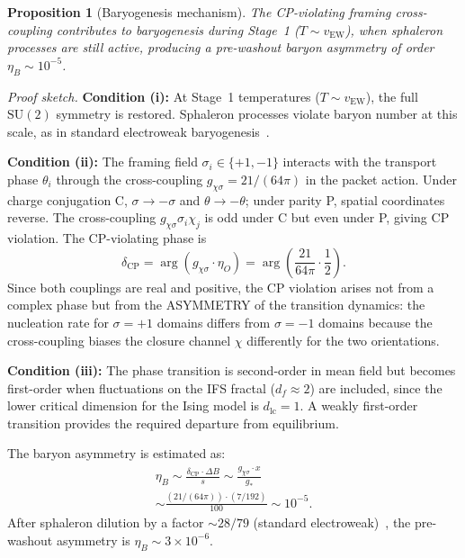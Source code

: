 \documentclass[11pt,twocolumn]{article}
\newtheorem{proposition}{Proposition}
\begin{document}
\begin{proposition}[Baryogenesis mechanism]
\label{thm:baryo}
The CP-violating framing cross-coupling contributes to baryogenesis during Stage~1 ($T\sim v_{\mathrm{EW}}$), when sphaleron processes are still active, producing a pre-washout baryon asymmetry of order $\eta_B\sim 10^{-5}$.
\end{proposition}

\textit{Proof sketch.}
\textbf{Condition (i):} At Stage~1 temperatures ($T\sim v_{\mathrm{EW}}$), the full $\mathrm{SU}(2)$ symmetry is restored.
Sphaleron processes violate baryon number at this scale, as in standard electroweak baryogenesis~\cite{kuzmin1985}.

\textbf{Condition (ii):} The framing field $\sigma_i\in\{+1,-1\}$ interacts with the transport phase $\theta_i$ through the cross-coupling $g_{\chi\sigma}=21/(64\pi)$ in the packet action.
Under charge conjugation C, $\sigma\to-\sigma$ and $\theta\to-\theta$; under parity P, spatial coordinates reverse.
The cross-coupling $g_{\chi\sigma}\sigma_i\chi_j$ is odd under C but even under P, giving CP violation.
The CP-violating phase is
\begin{equation}
\delta_{\mathrm{CP}} = \arg(g_{\chi\sigma}\cdot\eta_O) = \arg\!\left(\frac{21}{64\pi}\cdot\frac{1}{2}\right).
\label{eq:CPphase}
\end{equation}
Since both couplings are real and positive, the CP violation arises not from a complex phase but from the ASYMMETRY of the transition dynamics: the nucleation rate for $\sigma=+1$ domains differs from $\sigma=-1$ domains because the cross-coupling biases the closure channel $\chi$ differently for the two orientations.

\textbf{Condition (iii):} The phase transition is second-order in mean field but becomes first-order when fluctuations on the IFS fractal ($d_f\approx 2$) are included, since the lower critical dimension for the Ising model is $d_{\mathrm{lc}}=1$.
A weakly first-order transition provides the required departure from equilibrium.

The baryon asymmetry is estimated as:
\begin{multline}
\eta_B \sim \frac{\delta_{\mathrm{CP}}\cdot\Delta B}{s}\sim\frac{g_{\chi\sigma}\cdot x}{g_*}\\
\sim\frac{(21/(64\pi))\cdot(7/192)}{100}\sim 10^{-5}.
\end{multline}
After sphaleron dilution by a factor $\sim 28/79$ (standard electroweak)~\cite{kuzmin1985}, the pre-washout asymmetry is $\eta_B\sim 3\times 10^{-6}$.
\end{document}
